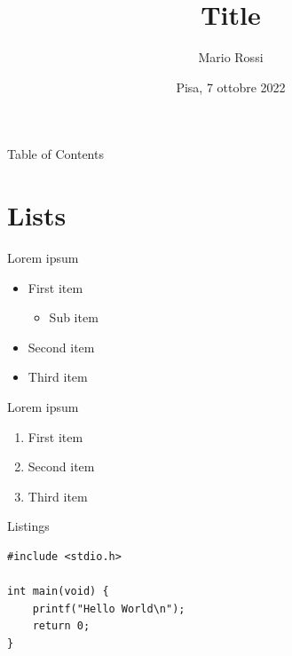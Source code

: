 \documentclass[11pt,svgnames,smaller,aspectratio=169]{beamer}
\title{Title}
\author{Mario Rossi}
\institute[Università di Pisa]{Università di Pisa\\Dipartimento di Informatica}
\date{Pisa, 7 ottobre 2022}
\begin{document}
\begin{frame} 
	\titlepage
\end{frame}



\begin{frame}{Table of Contents}
	\tableofcontents
\end{frame}


\section{Lists}
\begin{frame}
	\sectionpage
	\centering
\end{frame}

\begin{frame}{Lorem ipsum}
	\begin{itemize}
		\item First item
			\begin{itemize}
				\item Sub item
			\end{itemize}
		\item Second item
		\item Third item
	\end{itemize}
\end{frame}

\begin{frame}{Lorem ipsum}
	\begin{enumerate}
		\item First item
		\item Second item
		\item Third item
	\end{enumerate}
\end{frame}

\begin{frame}[fragile]{Listings}
	\begin{lstlisting}
#include <stdio.h>

int main(void) {
	printf("Hello World\n");
	return 0;
}
	\end{lstlisting}
\end{frame}
\end{document}

